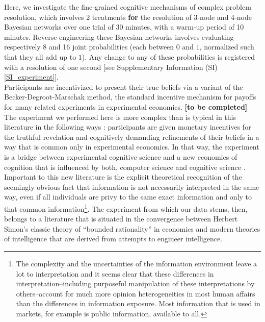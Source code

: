 Here, we investigate the fine-grained cognitive mechanisms of complex problem resolution, which involves 2 treatments {\bf for} the resolution of 3-node and 4-node Bayesian networks over one trial of 30 minutes, with a warm-up period of 10 minutes. Reverse-engineering these Bayesian networks involves evaluating respectively 8 and 16 joint probabilities (each between $0$ and $1$, normalized such that they all add up to $1$). Any change to any of these probabilities is registered with a resolution of one second [see Supplementary Information (SI) \ref{SI_experiment}].\\

Participants are incentivized to present their true beliefs via a variant of the Becker-Degroot-Marschak method, the standard incentive mechanism for payoffs for many related experiments in experimental economics. {\bf [to be completed]}\\

The experiment we performed here is more complex than is typical in this literature in the following ways : participants are given monetary incentives for the truthful revelation and cognitively demanding refinements of their beliefs in a way that is common only in experimental economics.  In that way, the experiment is a bridge between experimental cognitive science and a new economics of cognition that is influenced by both, computer science and cognitive science \cite{Spiegler2016}. Important to this new literature is the explicit theoretical recognition of the seemingly obvious fact that information is not necessarily interpreted in the same way, even if all individuals are privy to the same exact information and only to that common information\footnote{The complexity and the uncertainties of the information environment leave a lot to interpretation and it seems clear that these differences in interpretation--including purposeful manipulation of these interpretations by others--account for much more opinion heterogeneities in most human affairs than the differences in information exposure.  Most information that is used in markets, for example is public information, available to all.}. The experiment from which our data stems, then, belongs to a literature that is situated in the convergence between Herbert Simon's classic theory of ``bounded rationality'' in economics \cite{Gigerenzer2001, Rubinstein98, tsang2008computational, simon1955behavioral} and modern theories of intelligence that are derived from attempts to engineer intelligence.\\  

